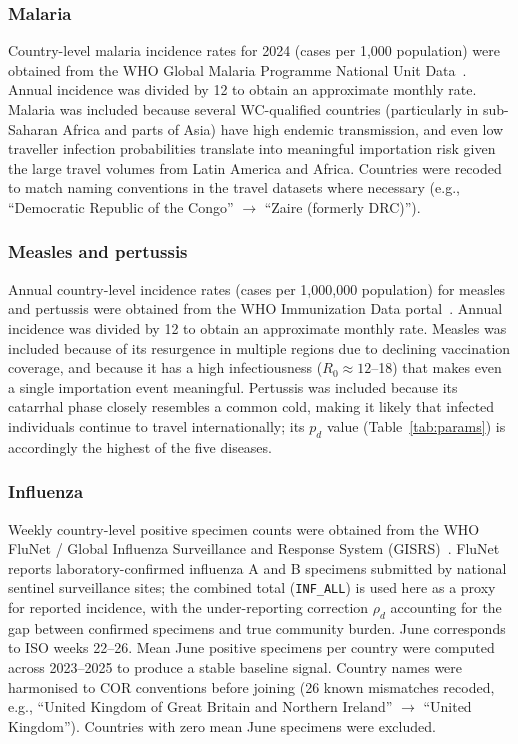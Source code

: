 \documentclass[12pt]{article}
\begin{document}
\subsubsection*{Malaria}

Country-level malaria incidence rates for 2024 (cases per 1,000
population) were obtained from the WHO Global Malaria Programme
National Unit Data~\cite{whoWMR2024}. Annual incidence was divided by 12 to obtain an
approximate monthly rate. Malaria was included because several
WC-qualified countries (particularly in sub-Saharan Africa and parts
of Asia) have high endemic transmission, and even low traveller
infection probabilities translate into meaningful importation risk
given the large travel volumes from Latin America and Africa.
Countries were recoded to match naming conventions in the travel
datasets where necessary (e.g.,
``Democratic Republic of the Congo'' $\to$ ``Zaire (formerly DRC)'').

\subsubsection*{Measles and pertussis}

Annual country-level incidence rates (cases per 1,000,000 population)
for measles and pertussis were obtained from the WHO Immunization Data
portal~\cite{WHO_immunization}. Annual
incidence was divided by 12 to obtain an approximate monthly rate.
Measles was included because of its resurgence in multiple regions due
to declining vaccination coverage, and because it has a high
infectiousness ($R_0 \approx 12$--18) that makes even a single
importation event meaningful. Pertussis was included because its
catarrhal phase closely resembles a common cold, making it likely that
infected individuals continue to travel internationally; its $p_d$
value (Table~\ref{tab:params}) is accordingly the highest of the five
diseases.

\subsubsection*{Influenza}

Weekly country-level positive specimen counts were obtained from the
WHO FluNet / Global Influenza Surveillance and Response System
(GISRS)~\cite{WHO_immunization}. FluNet reports laboratory-confirmed
influenza A and B specimens submitted by national sentinel surveillance
sites; the combined total (\texttt{INF\_ALL}) is used here as a proxy
for reported incidence, with the under-reporting correction $\rho_d$
accounting for the gap between confirmed specimens and true community
burden. June corresponds to ISO weeks 22--26. Mean June positive
specimens per country were computed across 2023--2025 to produce a
stable baseline signal. Country names were harmonised to COR
conventions before joining (26 known mismatches recoded, e.g.,
``United Kingdom of Great Britain and Northern Ireland'' $\to$
``United Kingdom''). Countries with zero mean June specimens were
excluded.
\end{document}
